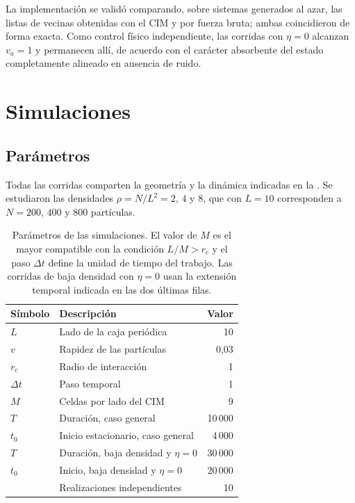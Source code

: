 \documentclass[11pt,a4paper]{article}
\begin{document}
La implementación se validó comparando, sobre sistemas generados al azar, las
listas de vecinas obtenidas con el CIM y por fuerza bruta; ambas coincidieron de
forma exacta. Como control físico independiente, las corridas con $\eta = 0$
alcanzan $v_a = 1$ y permanecen allí, de acuerdo con el carácter absorbente del
estado completamente alineado en ausencia de ruido.

\section{Simulaciones}
\label{sec:simulaciones}

\subsection{Parámetros}

Todas las corridas comparten la geometría y la dinámica indicadas en la
. Se estudiaron las densidades
$\rho = N/L^2 = 2$, $4$ y $8$, que con $L = 10$ corresponden a $N = 200$, $400$ y
$800$ partículas.

\begin{table}[htbp]
\centering
\caption{Parámetros de las simulaciones. El valor de $M$ es el mayor compatible
con la condición $L/M > r_c$ y el paso $\Delta t$ define la unidad de tiempo del
trabajo. Las corridas de baja densidad con $\eta=0$ usan la extensión temporal
indicada en las dos últimas filas.}
\label{tab:parametros}
\begin{tabular}{llr}
\toprule
Símbolo & Descripción & Valor \\
\midrule
$L$        & Lado de la caja periódica        & 10 \\
$v$        & Rapidez de las partículas        & 0,03 \\
$r_c$      & Radio de interacción             & 1 \\
$\Delta t$ & Paso temporal                    & 1 \\
$M$        & Celdas por lado del CIM          & 9 \\
$T$        & Duración, caso general            & 10\,000 \\
$t_0$      & Inicio estacionario, caso general & 4\,000 \\
$T$        & Duración, baja densidad y $\eta=0$ & 30\,000 \\
$t_0$      & Inicio, baja densidad y $\eta=0$ & 20\,000 \\
           & Realizaciones independientes     & 10 \\
\bottomrule
\end{tabular}
\end{table}
\end{document}
